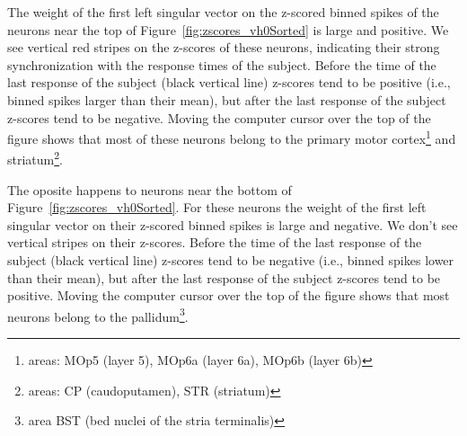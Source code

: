 \documentclass[12pt]{article}
\begin{document}
The weight of the first left singular vector on the z-scored binned spikes of
the neurons near the top of Figure~\ref{fig:zscores_vh0Sorted} is large and
positive. We see vertical red stripes on the z-scores of these neurons,
indicating their strong synchronization with the response times of the subject.
%
Before the time of the last response of the subject (black vertical line)
z-scores tend to be positive (i.e., binned spikes larger than their mean), but
after the last response of the subject z-scores tend to be negative.
%
Moving the computer cursor over the top of the figure shows that most of these
neurons belong to the primary motor cortex\footnote{areas: MOp5 (layer 5),
MOp6a (layer 6a), MOp6b (layer 6b)} and striatum\footnote{areas: CP
(caudoputamen), STR (striatum)}.

The oposite happens to neurons near the bottom of
Figure~\ref{fig:zscores_vh0Sorted}. For these neurons the weight of the first
left singular vector on their z-scored binned spikes is large and negative. We
don't see vertical stripes on their z-scores. Before the time of the last
response of the subject (black vertical line) z-scores tend to be negative
(i.e., binned spikes lower than their mean), but after the last response of the
subject z-scores tend to be positive.
%
Moving the computer cursor over the top of the figure shows that most neurons
belong to the pallidum\footnote{area BST (bed nuclei of the stria terminalis)}.
\end{document}
